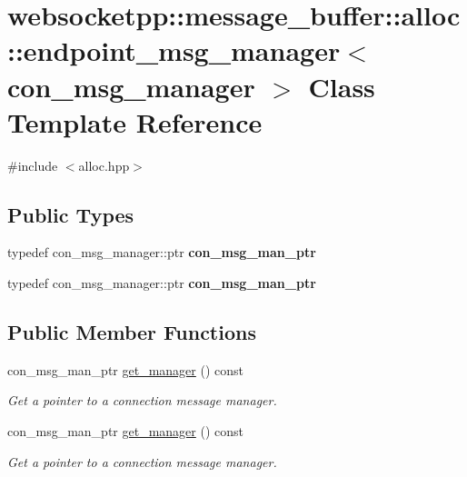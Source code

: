 \hypertarget{classwebsocketpp_1_1message__buffer_1_1alloc_1_1endpoint__msg__manager}{}\section{websocketpp\+:\+:message\+\_\+buffer\+:\+:alloc\+:\+:endpoint\+\_\+msg\+\_\+manager$<$ con\+\_\+msg\+\_\+manager $>$ Class Template Reference}
\label{classwebsocketpp_1_1message__buffer_1_1alloc_1_1endpoint__msg__manager}


{\ttfamily \#include $<$alloc.\+hpp$>$}

\subsection*{Public Types}
\begin{DoxyCompactItemize}
\item 
typedef con\+\_\+msg\+\_\+manager\+::ptr {\bfseries con\+\_\+msg\+\_\+man\+\_\+ptr}\hypertarget{classwebsocketpp_1_1message__buffer_1_1alloc_1_1endpoint__msg__manager_aa850684cf613468b4c6bb1497dcb2f52}{}\label{classwebsocketpp_1_1message__buffer_1_1alloc_1_1endpoint__msg__manager_aa850684cf613468b4c6bb1497dcb2f52}

\item 
typedef con\+\_\+msg\+\_\+manager\+::ptr {\bfseries con\+\_\+msg\+\_\+man\+\_\+ptr}\hypertarget{classwebsocketpp_1_1message__buffer_1_1alloc_1_1endpoint__msg__manager_aa850684cf613468b4c6bb1497dcb2f52}{}\label{classwebsocketpp_1_1message__buffer_1_1alloc_1_1endpoint__msg__manager_aa850684cf613468b4c6bb1497dcb2f52}

\end{DoxyCompactItemize}
\subsection*{Public Member Functions}
\begin{DoxyCompactItemize}
\item 
con\+\_\+msg\+\_\+man\+\_\+ptr \hyperlink{classwebsocketpp_1_1message__buffer_1_1alloc_1_1endpoint__msg__manager_a58c3cece7c5122cfabb4f0071cd9ced4}{get\+\_\+manager} () const
\begin{DoxyCompactList}\small\item\em Get a pointer to a connection message manager. \end{DoxyCompactList}\item 
con\+\_\+msg\+\_\+man\+\_\+ptr \hyperlink{classwebsocketpp_1_1message__buffer_1_1alloc_1_1endpoint__msg__manager_a58c3cece7c5122cfabb4f0071cd9ced4}{get\+\_\+manager} () const
\begin{DoxyCompactList}\small\item\em Get a pointer to a connection message manager. \end{DoxyCompactList}\end{DoxyCompactItemize}



